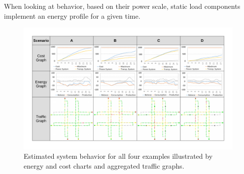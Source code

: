 



When looking at behavior, based on their power scale, static load components implement an energy profile for a given time. 

\begin{figure}[t]
	\centering
	\includegraphics[width=\textwidth]{../gfx/examples.pdf}
	\caption{Estimated system behavior for all four examples illustrated by energy and cost charts and aggregated traffic graphs.}
	\label{figure:examples}
\end{figure}